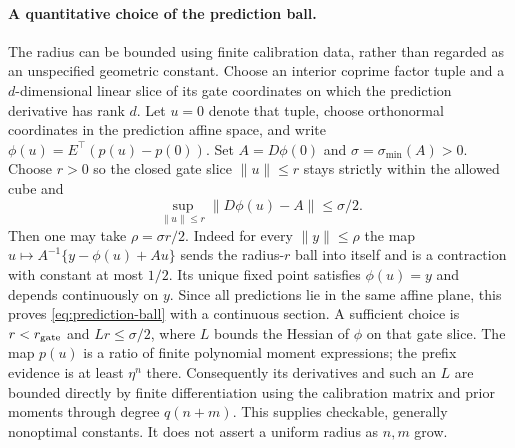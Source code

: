 \paragraph{A quantitative choice of the prediction ball.}
The radius can be bounded using finite calibration data, rather than
regarded as an unspecified geometric constant. Choose an interior coprime
factor tuple and a $d$-dimensional linear slice of its gate coordinates on
which the prediction derivative has rank $d$. Let $u=0$ denote that tuple,
choose orthonormal coordinates in the prediction affine space, and write
$\phi(u)=E^\top(p(u)-p(0))$. Set $A=D\phi(0)$ and
$\sigma=\sigma_{\min}(A)>0$. Choose $r>0$ so the closed gate slice
$\|u\|\le r$ stays strictly within the allowed cube and
\[
 \sup_{\|u\|\le r}\|D\phi(u)-A\|\le\sigma/2.
\]
Then one may take $\rho=\sigma r/2$. Indeed for every $\|y\|\le\rho$ the
map $u\mapsto A^{-1}\{y-\phi(u)+Au\}$ sends the radius-$r$ ball into
itself and is a contraction with constant at most $1/2$. Its unique fixed
point satisfies $\phi(u)=y$ and depends continuously on $y$. Since all
predictions lie in the same affine plane, this proves
\eqref{eq:prediction-ball} with a continuous section. A sufficient choice
is $r<r_{\rm gate}$ and $Lr\le\sigma/2$, where $L$ bounds the Hessian of
$\phi$ on that gate slice. The map $p(u)$ is a ratio of finite polynomial
moment expressions; the prefix evidence is at least $\eta^n$ there.
Consequently its derivatives and such an $L$ are bounded directly by
finite differentiation using the calibration matrix and prior moments
through degree $q(n+m)$. This supplies checkable, generally nonoptimal
constants. It does not assert a uniform radius as $n,m$ grow.

